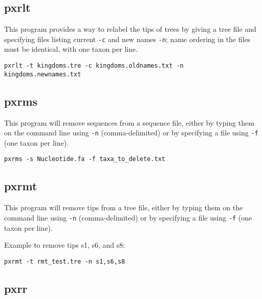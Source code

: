 \documentclass[12pt,letterpaper]{memoir}
\begin{document}
\subsection{pxrlt}

This program provides a way to relabel the tips of trees by giving a tree file and specifying files listing current \texttt{-c} and new names \texttt{-n}; name ordering in the files must be identical, with one taxon per line.

\begin{flushleft}
\begin{verbatim}
pxrlt -t kingdoms.tre -c kingdoms.oldnames.txt -n kingdoms.newnames.txt
\end{verbatim}
\end{flushleft}

\subsection{pxrms}

This program will remove sequences from a sequence file, either by typing them on the command line using \texttt{-n} (comma-delimited) or by specifying a file using \texttt{-f} (one taxon per line).

\begin{flushleft}
\begin{verbatim}
pxrms -s Nucleotide.fa -f taxa_to_delete.txt
\end{verbatim}
\end{flushleft}

\subsection{pxrmt}

This program will remove tips from a tree file, either by typing them on the command line using \texttt{-n} (comma-delimited) or by specifying a file using \texttt{-f} (one taxon per line).

\begin{flushleft}
Example to remove tips s1, s6, and s8:
\begin{verbatim}
pxrmt -t rmt_test.tre -n s1,s6,s8
\end{verbatim}
\end{flushleft}

\subsection{pxrr}
\end{document}
